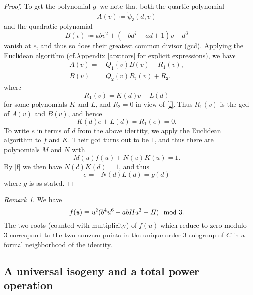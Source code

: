 \documentclass{gtpart}
\theoremstyle{definition}
\theoremstyle{remark}
\newtheorem{rmk}[thm]{Remark}
\newcommand{\cf}{cf.\thinspace}
\newcommand{\Tp}{\widetilde{\psi}}
\newcommand{\md}{~~{\rm mod}~}
\begin{document}
\begin{proof}
 To get the polynomial $g$, we note that both the quartic polynomial 
 \[
  A(v) \coloneqq \Tp_3(d,v) 
 \]
 and the quadratic polynomial 
 \[
  B(v) \coloneqq a b v^2 + (-b d^2 + a d + 1) v - d^3 
 \]
 vanish at $e$, and thus so does their greatest common divisor (gcd).  
 Applying the Euclidean algorithm (\cf Appendix \ref{apx:tors} for explicit expressions), we have 
 \begin{equation*}
 \begin{split}
  A(v) = & ~ Q_1(v) B(v) + R_1(v), \\
  B(v) = & ~ Q_2(v) R_1(v) + R_2, 
 \end{split}
 \end{equation*}
 where 
 \[
  R_1(v) = K(d) v + L(d) 
 \]
 for some polynomials $K$ and $L$, and $R_2 = 0$ in view of \eqref{f}.  Thus $R_1(v)$ is the gcd of $A(v)$ and $B(v)$, and hence 
 \[
  K(d) e + L(d) = R_1(e) = 0.  
 \]
 To write $e$ in terms of $d$ from the above identity, we apply the Euclidean algorithm to $f$ and $K$.  
 Their gcd turns out to be 1, and thus there are polynomials $M$ and $N$ with 
 \[
  M(u) f(u) + N(u) K(u) = 1.  
 \]
 By \eqref{f} we then have $N(d) K(d) = 1$, and thus 
 \[
  e = -N(d) L(d) = g(d) 
 \]
 where $g$ is as stated.  
\end{proof}

\begin{rmk}
\label{rmk:dmod3}
 We have 
 \[
  f(u) \equiv u^2 (b^4 u^6 + a b H u^3 - H) \md 3.  
 \]
 The two roots (counted with multiplicity) of $f(u)$ which reduce to zero modulo 3 correspond to 
 the two nonzero points in the unique order-3 subgroup of $C$ in a formal neighborhood of the identity.  
\end{rmk}


\subsection{A universal isogeny and a total power operation}
\end{document}
